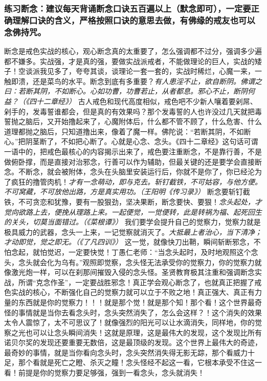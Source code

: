 \subsubsection{练习断念：建议每天背诵断念口诀五百遍以上（默念即可），一定要正确理解口诀的含义，严格按照口诀的意思去做，有佛缘的戒友也可以念佛持咒。}

断念是戒色实战的核心，观心断念真的太重要了，怎么强调都不过分，强调多少遍都不嫌多。实战强，才是真的强，要做实战派戒者，不能做理论的巨人，实战的矮子！空谈派我见多了，夸夸其谈，谈理论一套一套的，实战时稀烂，心魔一来，一触即溃，还是菜鸟的水平。断念到底有多重要？\textit{有人患淫不止，欲自断阴。佛谓之曰：若断其阴，不如断心。心如功曹，功曹若止，从者都息。邪心不止，断阴何益？（《四十二章经》）} 古人戒色和现代高度相似，戒色吧不少新人嚷着要剁屌、剁手的，发毒誓谁都会，但是真的有效果吗？那个发毒誓的人也许没过几天就把毒誓抛之脑后，又开始撸起来了，心魔附体后，什么都不管不顾了，什么危害、什么道理都抛之脑后，只知道撸出来，像着了魔一样。佛陀说：“若断其阴，不如断心。”把阴茎断了，不如把心断了。心就是心念、念头。《四十二章经》这句话可谓一语中的，把戒色最核心的内容揭示出来了，戒色要注重断念，不是靠行善，不是做俯卧撑，而是直接对治邪念，行善可以作为辅助，但最关键的还是要学会直接断念。不断念，就会被附体，念头在头脑里安装运行后，你就不是你了，你已经沦为了疯狂的撸管肉机！\textit{才有一念萌动，即与克去。斩钉截铁，不可姑容，与他方便。不可窝藏，不可放他出路，方是真实用功。（王阳明《传习录》）} 断念要斩钉截铁，不可贪恋和犹豫，要有一股狠劲，坚决果断，断念要快、要狠！\textit{念头起处，才觉向欲路上去，便挽从理路上来。一起便觉，一觉便转，此是转祸为福、起死回生的关头，切莫当面错过。（《菜根谭》）} 我们要学会提升自己的觉察力，觉察力就是极具威力的武器，念头一上来，一记觉察就消灭了。\textit{大抵最上者治心，当下清净；才动即觉，觉之即无。（《了凡四训》）} 这一觉，就像快刀出鞘，瞬间斩断邪念，不怕念起，就怕觉迟，一定要快觉！丁愚仁老师：“当念头起时，及时地观照这个念头，念头就会化为乌有。”观照即觉察，念头怪无法承受你的觉察力，你的觉察力就像激光炮一样，可以在刹那间摧毁入侵的念头怪。圣贤教育极其注重和强调断念实战，所谓“克念作圣”，一定要战胜邪念！真正学会观心断念了，也就真正把握了戒色实战的核心，不断强化自己的觉察力就可以立于不败之地！真正强大、真正有力量的东西就是你的觉察力！！！就是那个觉！就是那个知！那个看！这个世界最奇怪的事情就是当你去看念头时，念头突然消失了，怎么会这样？！这个消失的效果太令人震惊了，太不可思议了！就像强烈的阳光可以让水滴消失，同样地，你的觉察之光也可以让念头瞬间消失！这就是原理，这是最伟大的发现，这个发现比所有诺贝尔奖的发现还要重要无数倍，这是最顶级的发现。这个世界上最伟大的奇迹，最奇妙的事情，就是当你看向念头时，念头突然消失得无影无踪，那个看威力十足，那个看就是死亡之瞪、杀灭之瞳！念头怪经不起这一看，它根本承受不住这一看！前提是你的觉察力要足够强，强到一看念头，念头就消失！

